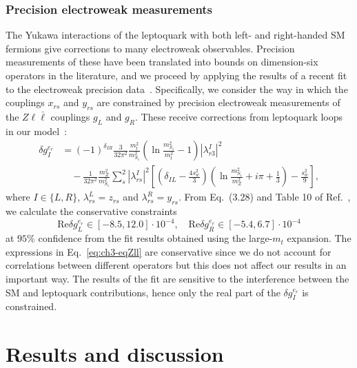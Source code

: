 \subsubsection{Precision electroweak measurements}

The Yukawa interactions of the leptoquark with both left- and right-handed SM
fermions give corrections to many electroweak observables. Precision
measurements of these have been translated into bounds on dimension-six
operators in the literature, and we proceed by applying the results of a recent
fit to the electroweak precision data~\cite{Ciuchini:2013pca}. Specifically, we
consider the way in which the couplings $x_{rs}$ and $y_{rs}$ are constrained by
precision electroweak measurements of the $Z \ell \bar{\ell}$ couplings $g_L$
and $g_R$. These receive corrections from leptoquark loops in our
model~\cite{Bauer:2015knc}:
\begin{equation} \label{eq:ch3-neccond}
  \begin{split}
  \delta g_I^{e_r} &= (-1)^{\delta_{IR}} \frac{3}{32 \pi^2} \frac{m_t^2}{m_{S_{1}}^2} \left( \ln \frac{m_{S_{1}}^2}{m_t^2} - 1 \right) |\lambda^I_{r 3}|^2 \\ &\quad - \frac{1}{32 \pi^2}\frac{m_Z^2}{m_{S_{1}}^2}\sum_{s}^2 |\lambda^I_{r s}|^2 \left[ \left( \delta_{IL} - \frac{4 s_w^2}{3} \right) \left( \ln\frac{m_{S_{1}}^2}{m_Z^2} + i\pi + \frac{1}{3} \right) - \frac{s_w^2}{9}\right],
  \end{split}
\end{equation}
where $I \in \{L,R\}$, $\lambda^L_{rs} = z_{rs}$ and $\lambda^R_{rs} = y_{rs}$.
From Eq.~(3.28) and Table 10 of Ref.~\cite{Ciuchini:2013pca}, we calculate the
conservative constraints
\begin{equation} \label{eq:ch3-eqZll}
  \text{Re}\delta g_L^{e_r} \in [-8.5, 12.0] \cdot 10^{-4}, \quad \text{Re}\delta g_R^{e_r} \in [-5.4, 6.7] \cdot 10^{-4}
\end{equation}
at $95\%$ confidence from the fit results obtained using the large-$m_t$
expansion. The expressions in Eq.~\eqref{eq:ch3-eqZll} are conservative since we do
not account for correlations between different operators but this does not
affect our results in an important way. The results of the fit are sensitive to
the interference between the SM and leptoquark contributions, hence only the
real part of the $\delta g_I^{e_r}$ is constrained.

\section{Results and discussion}
\label{sec:ch3-resultsanddiscussion}

